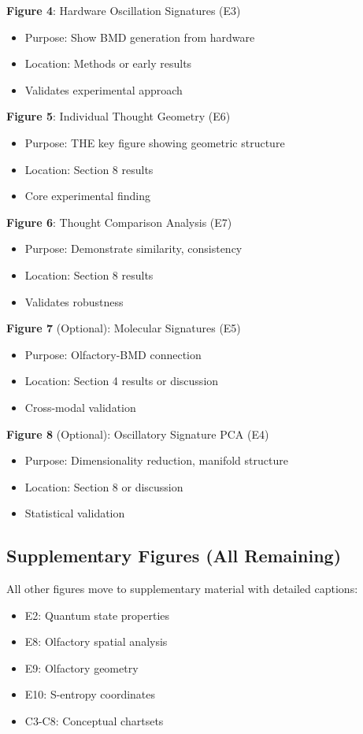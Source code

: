 \documentclass[11pt]{article}
\begin{document}
\textbf{Figure 4}: Hardware Oscillation Signatures (E3)
\begin{itemize}
\item Purpose: Show BMD generation from hardware
\item Location: Methods or early results
\item Validates experimental approach
\end{itemize}

\textbf{Figure 5}: Individual Thought Geometry (E6)
\begin{itemize}
\item Purpose: THE key figure showing geometric structure
\item Location: Section 8 results
\item Core experimental finding
\end{itemize}

\textbf{Figure 6}: Thought Comparison Analysis (E7)
\begin{itemize}
\item Purpose: Demonstrate similarity, consistency
\item Location: Section 8 results
\item Validates robustness
\end{itemize}

\textbf{Figure 7} (Optional): Molecular Signatures (E5)
\begin{itemize}
\item Purpose: Olfactory-BMD connection
\item Location: Section 4 results or discussion
\item Cross-modal validation
\end{itemize}

\textbf{Figure 8} (Optional): Oscillatory Signature PCA (E4)
\begin{itemize}
\item Purpose: Dimensionality reduction, manifold structure
\item Location: Section 8 or discussion
\item Statistical validation
\end{itemize}

\subsection{Supplementary Figures (All Remaining)}

All other figures move to supplementary material with detailed captions:
\begin{itemize}
\item E2: Quantum state properties
\item E8: Olfactory spatial analysis
\item E9: Olfactory geometry
\item E10: S-entropy coordinates
\item C3-C8: Conceptual chartsets
\end{itemize}
\end{document}

